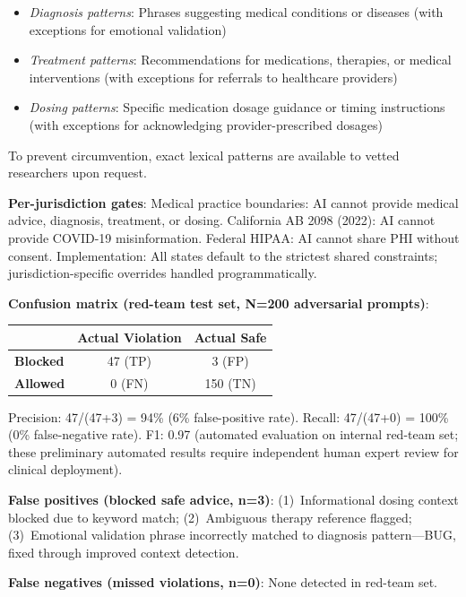 \documentclass{article}
\begin{document}
\begin{itemize}
    \item \textit{Diagnosis patterns}: Phrases suggesting medical conditions or diseases (with exceptions for emotional validation)
    \item \textit{Treatment patterns}: Recommendations for medications, therapies, or medical interventions (with exceptions for referrals to healthcare providers)
    \item \textit{Dosing patterns}: Specific medication dosage guidance or timing instructions (with exceptions for acknowledging provider-prescribed dosages)
\end{itemize}

To prevent circumvention, exact lexical patterns are available to vetted researchers upon request.

\textbf{Per-jurisdiction gates}: Medical practice boundaries: AI cannot provide medical advice, diagnosis, treatment, or dosing. California AB 2098 (2022): AI cannot provide COVID-19 misinformation. Federal HIPAA: AI cannot share PHI without consent. Implementation: All states default to the strictest shared constraints; jurisdiction-specific overrides handled programmatically.

\textbf{Confusion matrix (red-team test set, N=200 adversarial prompts)}:

\begin{table}[htbp]
\centering
\small
\begin{tabular}{lcc}
\toprule
 & \textbf{Actual Violation} & \textbf{Actual Safe} \\
\midrule
\textbf{Blocked} & 47 (TP) & 3 (FP) \\
\textbf{Allowed} & 0 (FN) & 150 (TN) \\
\bottomrule
\end{tabular}
\end{table}
Precision: 47/(47+3) = 94\% (6\% false-positive rate). Recall: 47/(47+0) = 100\% (0\% false-negative rate). F1: 0.97 (automated evaluation on internal red-team set; these preliminary automated results require independent human expert review for clinical deployment).

\textbf{False positives (blocked safe advice, n=3)}: (1)~Informational dosing context blocked due to keyword match; (2)~Ambiguous therapy reference flagged; (3)~Emotional validation phrase incorrectly matched to diagnosis pattern—BUG, fixed through improved context detection.

\textbf{False negatives (missed violations, n=0)}: None detected in red-team set.
\end{document}
